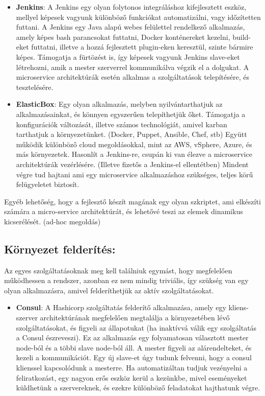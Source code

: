 \documentclass[11pt,magyar,a4paper,oneside,]{report}
\providecommand{\tightlist}{%
  \setlength{\itemsep}{0pt}\setlength{\parskip}{0pt}}
\begin{document}
\begin{itemize}
\item
  \textbf{Jenkins}: A Jenkins egy olyan folytonos integráláshoz
  kifejlesztett eszköz, mellyel képesek vagyunk különböző funkciókat
  automatizálni, vagy időzítetten futtani. A Jenkins egy Java alapú
  webes felülettel rendelkező alkalmazás, amely képes bash parancsokat
  futtatni, Docker konténereket kezelni, build-eket futtatni, illetve a
  hozzá fejlesztett plugin-eken keresztül, szinte bármire képes.
  Támogatja a fürtözést is, így képesek vagyunk Jenkins slave-eket
  létrehozni, amik a mester szerverrel kommunikálva végzik el a
  dolgukat. A microservice architektúrák esetén alkalmas a
  szolgáltatások telepítésére, és tesztelésére.
\item
  \textbf{ElasticBox}: Egy olyan alkalmazás, melyben nyilvántarthatjuk
  az alkalmazásainkat, és könnyen egyszerűen telepíthetjük őket.
  Támogatja a konfigurációk változását, illetve számos technológiát,
  amivel karban tarthatjuk a környezetünket. (Docker, Puppet, Ansible,
  Chef, stb) Együtt működik különböző cloud megoldásokkal, mint az AWS,
  vSphere, Azure, és más környezetek. Hasonlít a Jenkins-re, csupán ki
  van élezve a microservice architektúrák vezérlésére. (Illetve fizetős
  a Jenkins-el ellentétben) Mindent végre tud hajtani ami egy
  microservice alkalmazáshoz szükséges, teljes körű felügyeletet
  biztosít.
\end{itemize}

Egyéb lehetőség, hogy a fejlesztő készít magának egy olyan szkriptet,
ami elkészíti számára a micro-service architektúrát, és lehetővé teszi
az elemek dinamikus kicserélését. (ad-hoc megoldás)

\subsection{Környezet felderítés:}\label{kuxf6rnyezet-felderuxedtuxe9s}

Az egyes szolgáltatásoknak meg kell találniuk egymást, hogy megfelelően
működhessen a rendszer, azonban ez nem mindig triviális, így szükség van
egy olyan alkalmazásra, amivel felderíthetjük az aktív szolgáltatásokat.

\begin{itemize}
\tightlist
\item
  \textbf{Consul}: A Hashicorp szolgáltatás felderítő alkalmazása, amely
  egy kliens-szerver architektúrának megfelelően megtalálja a
  környezetében lévő szolgáltatásokat, és figyeli az állapotukat (ha
  inaktívvá válik egy szolgáltatás a Consul észreveszi). Ez az
  alkalmazás egy folyamatosan választott mester node-ból és a többi
  slave node-ból áll. A mester figyeli az alárendelteket, és kezeli a
  kommunikációt. Egy új slave-et úgy tudunk felvenni, hogy a consul
  klienssel kapcsolódunk a mesterre. Ha automatizáltan tudjuk vezényelni
  a feliratkozást, egy nagyon erős eszköz kerül a kezünkbe, mivel
  eseményeket küldhetünk a szervereknek, és ezekre különböző feladatokat
  hajthatunk végre.
\end{itemize}
\end{document}
